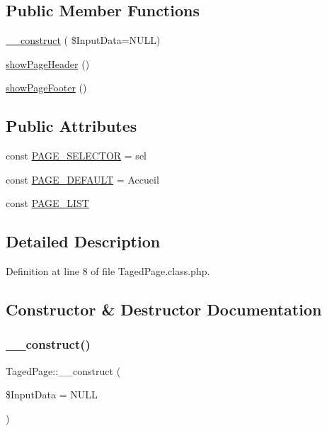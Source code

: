 \subsection*{Public Member Functions}
\begin{DoxyCompactItemize}
\item 
\hyperlink{class_taged_page_ad039f1ca3ac7dff6a8722db3630aca24}{\+\_\+\+\_\+construct} ( \$Input\+Data=N\+U\+LL)
\item 
\hyperlink{class_taged_page_ad5e40098b03ac3f0aab840cad680c91e}{show\+Page\+Header} ()
\item 
\hyperlink{class_taged_page_a1234aefa5c7b8301eb508d00692e6ce2}{show\+Page\+Footer} ()
\end{DoxyCompactItemize}
\subsection*{Public Attributes}
\begin{DoxyCompactItemize}
\item 
const \hyperlink{class_taged_page_a59afec55d391b3bd42161255c7e8358f}{P\+A\+G\+E\+\_\+\+S\+E\+L\+E\+C\+T\+OR} = \textquotesingle{}sel\textquotesingle{}
\item 
const \hyperlink{class_taged_page_a9083797ee4743765a6db47c72715a419}{P\+A\+G\+E\+\_\+\+D\+E\+F\+A\+U\+LT} = \textquotesingle{}Accueil\textquotesingle{}
\item 
const \hyperlink{class_taged_page_ab1165c7973c632c2c70a5083c241d7c0}{P\+A\+G\+E\+\_\+\+L\+I\+ST}
\end{DoxyCompactItemize}


\subsection{Detailed Description}


Definition at line 8 of file Taged\+Page.\+class.\+php.



\subsection{Constructor \& Destructor Documentation}
\mbox{\label{class_taged_page_ad039f1ca3ac7dff6a8722db3630aca24}} 
\subsubsection{\texorpdfstring{\+\_\+\+\_\+construct()}{\_\_construct()}}
{\footnotesize\ttfamily Taged\+Page\+::\+\_\+\+\_\+construct (\begin{DoxyParamCaption}\item[{}]{\$\+Input\+Data = {\ttfamily NULL} }\end{DoxyParamCaption})}

